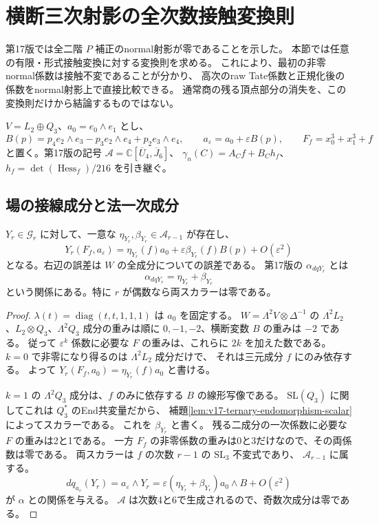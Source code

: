 \section{横断三次射影の全次数接触変換則}
\label{sec:v18-normal-contact-functoriality}

第17版では全二階 $P$ 補正のnormal射影が零であることを示した。
本節では任意の有限・形式接触変換に対する変換則を求める。
これにより、最初の非零normal係数は接触不変であることが分かり、
高次のraw Tate係数と正規化後の係数をnormal射影上で直接比較できる。
通常商の残る頂点部分の消失を、この変換則だけから結論するものではない。

$V=L_2\oplus Q_3$、$a_0=e_0\wedge e_1$ とし、
\[
 B(p)=p_4e_2\wedge e_3-p_3e_2\wedge e_4+p_2e_3\wedge e_4,
 \qquad a_\varepsilon=a_0+\varepsilon B(p),
 \qquad F_f=x_0^3+x_1^3+f
\]
と置く。第17版の記号
$\mathcal A=\mathbb C[\overline U_4,\overline J_6]$、
$\gamma_n(C)=A_Cf+B_Ch_f$、$h_f=\det(\operatorname{Hess}_f)/216$
を引き継ぐ。

\subsection{場の接線成分と法一次成分}

\begin{lemma}[rank二切片上の二つのスカラー]
\label{lem:v18-two-normal-field-scalars}
$Y_r\in\mathcal G_r$ に対して、一意な
$\eta_{Y_r},\beta_{Y_r}\in\mathcal A_{r-1}$ が存在し、
\begin{equation}\label{eq:v18-two-normal-field-scalars}
 Y_r(F_f,a_\varepsilon)
   =\eta_{Y_r}(f)a_0
     +\varepsilon\beta_{Y_r}(f)B(p)+O(\varepsilon^2)
\end{equation}
となる。右辺の誤差は $W$ の全成分についての誤差である。
第17版の $\alpha_{dqY_r}$ とは
\[
 \alpha_{dqY_r}=\eta_{Y_r}+\beta_{Y_r}
\]
という関係にある。特に $r$ が偶数なら両スカラーは零である。
\end{lemma}

\begin{proof}
$\lambda(t)=\operatorname{diag}(t,t,1,1,1)$ は $a_0$ を固定する。
$W=\Lambda^2V\otimes\Delta^{-1}$ の
$\Lambda^2L_2$、$L_2\otimes Q_3$、$\Lambda^2Q_3$ 成分の重みは順に
$0,-1,-2$、横断変数 $B$ の重みは $-2$ である。
従って $\varepsilon^k$ 係数に必要な $F$ の重みは、これらに $2k$ を加えた数である。
$k=0$ で非零になり得るのは $\Lambda^2L_2$ 成分だけで、
それは三元成分 $f$ にのみ依存する。
よって $Y_r(F_f,a_0)=\eta_{Y_r}(f)a_0$ と書ける。

$k=1$ の $\Lambda^2Q_3$ 成分は、$f$ のみに依存する $B$ の線形写像である。
$\mathrm{SL}(Q_3)$ に関してこれは $Q_3^*$ のEnd共変量だから、
補題\ref{lem:v17-ternary-endomorphism-scalar}によってスカラーである。
これを $\beta_{Y_r}$ と書く。
残る二成分の一次係数に必要な $F$ の重みは2と1である。
一方 $F_f$ の非零係数の重みは0と3だけなので、その両係数は零である。
両スカラーは $f$ の次数 $r-1$ の $\mathrm{SL}_3$ 不変式であり、
$\mathcal A_{r-1}$ に属する。
\[
 dq_{a_\varepsilon}(Y_r)
   =a_\varepsilon\wedge Y_r
   =\varepsilon(\eta_{Y_r}+\beta_{Y_r})a_0\wedge B+O(\varepsilon^2)
\]
が $\alpha$ との関係を与える。
$\mathcal A$ は次数4と6で生成されるので、奇数次成分は零である。
\end{proof}

